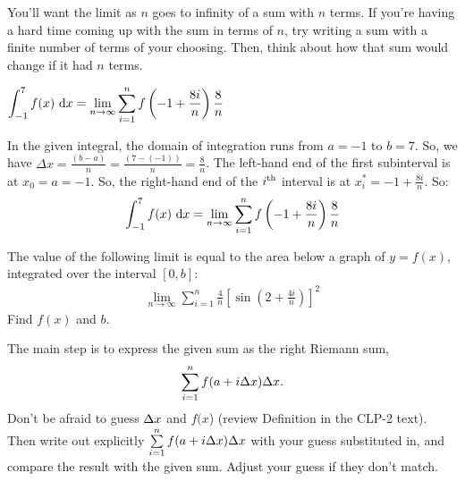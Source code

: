 \begin{hint}
You'll want the limit as $n$ goes to infinity of a sum with $n$ terms. If you're having a hard time coming up with the sum in terms of $n$, try writing a sum with a finite number of terms of your choosing. Then, think about how that sum would change if it had $n$ terms.
\end{hint}

\begin{answer}
$\displaystyle\int_{-1}^{7}f(x)\,\,\mathrm{d}x=\displaystyle\lim_{n\to\infty}\displaystyle\sum_{i=1}^{n} f\left(-1+\frac{8i}{n}\right)\frac{8}{n}$
\end{answer}

\begin{solution}
In the given integral, the domain of integration runs from $a=-1$ to $b=7$.
So, we have $\Delta x = \frac{(b-a)}{n}= \frac{(7-(-1))}{n} = \frac{8}{n}$. The left-hand end of the first
subinterval is at $x_0=a=-1$. So, the right-hand end of the $i^{\rm th}$ interval
is at $x_i^* = -1+\frac{8i}{n}$. So:
\begin{align*}
\int_{-1}^{7}f(x)\,\,\mathrm{d}x
=\lim_{n\to\infty}\sum_{i=1}^{n} f\left(-1+\frac{8i}{n}\right)\frac{8}{n}
\end{align*}

\end{solution}

\begin{question}[2016Q1]
The value of the following limit is equal to the area below a graph of $y=f(x)$, integrated over the interval $[0,b]$:
\begin{align*}
   \lim_{n \to \infty} \sum_{i=1}^{n} \frac{4}{n}
          \left[ \sin \left( 2 + \frac{4i}{n}\right)\right]^2
\end{align*}
Find $f(x)$ and $b$.
\end{question}

\begin{hint}
The main step is to express the given sum as the right Riemann sum,
\[\sum_{i=1}^{n} f(a+i\Delta x)\Delta  x.\]
Don't be afraid to guess $\Delta x$ and $f(x$)
(review Definition   in the
CLP-2 text).
Then write out explicitly $ \sum\limits_{i=1}^{n} f(a+i\Delta x)\Delta  x$
with your guess substituted in, and compare the result with the given sum.  Adjust your guess if they don't match.
\end{hint}

